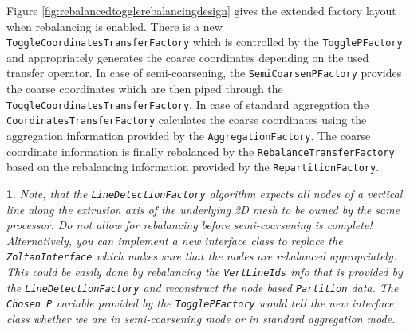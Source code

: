 \documentclass[10pt,fleqn]{book}
\newtheorem*{mycomment}{\ding{42}}
\begin{document}
Figure \ref{fig:rebalancedtogglerebalancingdesign} gives the extended factory layout when rebalancing is enabled.
There is a new \texttt{ToggleCoordinatesTransferFactory} which is controlled by the \texttt{TogglePFactory} and appropriately generates the coarse coordinates depending on the used transfer operator. In case of semi-coarsening, the \texttt{SemiCoarsenPFactory} provides the coarse coordinates which are then piped through the \texttt{ToggleCoordinatesTransferFactory}. In case of standard aggregation the \texttt{CoordinatesTransferFactory} calculates the coarse coordinates using the aggregation information provided by the \texttt{AggregationFactory}. The coarse coordinate information is finally rebalanced by the \texttt{RebalanceTransferFactory} based on the rebalancing information provided by the \texttt{RepartitionFactory}.

\begin{mycomment}
Note, that the \texttt{LineDetectionFactory} algorithm expects all nodes of a vertical line along the extrusion axis of the underlying 2D mesh to be owned by the same processor. Do not allow for rebalancing before semi-coarsening is complete! Alternatively, you can implement a new interface class to replace the \texttt{ZoltanInterface} which makes sure that the nodes are rebalanced appropriately. This could be easily done by rebalancing the \texttt{VertLineIds} info that is provided by the \texttt{LineDetectionFactory} and reconstruct the node based \texttt{Partition} data. The \texttt{Chosen P} variable provided by the \texttt{TogglePFactory} would tell the new interface class whether we are in semi-coarsening mode or in standard aggregation mode.
\end{mycomment}
\end{document}

